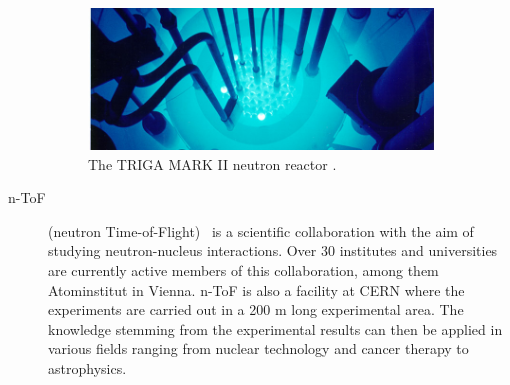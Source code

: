 \begin{description}
\begin{figure}[!t]
\centering
\includegraphics[width=0.9\textwidth]{01_introduction/pics/triga}
\caption{The TRIGA MARK II neutron reactor \cite{GeneralAtomics}.}
\label{fig:triga}
\end{figure}




\item[n-ToF] (neutron Time-of-Flight)~\cite{NTOF:00000} is a scientific collaboration with the aim of studying neutron-nucleus interactions. Over 30 institutes and universities are currently active members of this collaboration, among them Atominstitut in Vienna. n-ToF is also a facility at CERN where the experiments are carried out in a 200 m long experimental area. The knowledge stemming from the experimental results can then be applied in various fields ranging from nuclear technology and cancer therapy to astrophysics.


\end{description}
